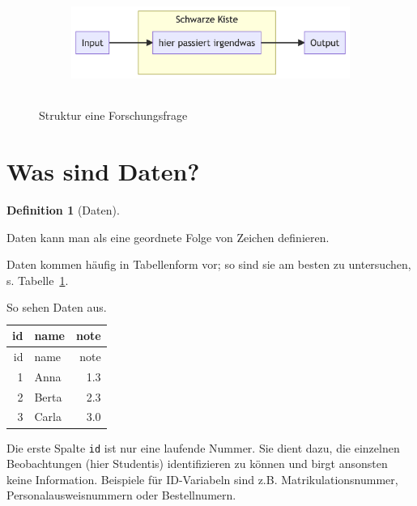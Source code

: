 \documentclass[
  a4paper,
  DIV=11]{scrreprt}
\theoremstyle{definition}
\newtheorem{definition}{Definition}[chapter]
\theoremstyle{definition}
\theoremstyle{remark}
\begin{document}
\begin{figure}

{\centering 

\begin{figure}[H]

{\centering \includegraphics[width=4.99in,height=1.3in]{./fragenstellen_files/figure-latex/mermaid-figure-4.png}

}

\end{figure}

}

\caption{\label{fig-fo-struktur}Struktur eine Forschungsfrage}

\end{figure}

\hypertarget{was-sind-daten}{%
\section{Was sind Daten?}\label{was-sind-daten}}

\leavevmode{}%
\begin{definition}[Daten]\label{def-daten}

Daten kann man als eine geordnete Folge von Zeichen definieren.

\end{definition}

Daten kommen häufig in Tabellenform vor; so sind sie am besten zu
untersuchen, s. Tabelle~\ref{tbl-daten}.

\hypertarget{tbl-daten}{}
\begin{longtable}[]{@{}rlr@{}}
\caption{\label{tbl-daten}So sehen Daten aus.}\tabularnewline
\toprule()
id & name & note \\
\midrule()
\endfirsthead
\toprule()
id & name & note \\
\midrule()
\endhead
1 & Anna & 1.3 \\
2 & Berta & 2.3 \\
3 & Carla & 3.0 \\
\bottomrule()
\end{longtable}

Die erste Spalte \texttt{id} ist nur eine laufende Nummer. Sie dient
dazu, die einzelnen Beobachtungen (hier Studentis) identifizieren zu
können und birgt ansonsten keine Information. Beispiele für ID-Variabeln
sind z.B. Matrikulationsnummer, Personalausweisnummern oder
Bestellnumern.
\end{document}
